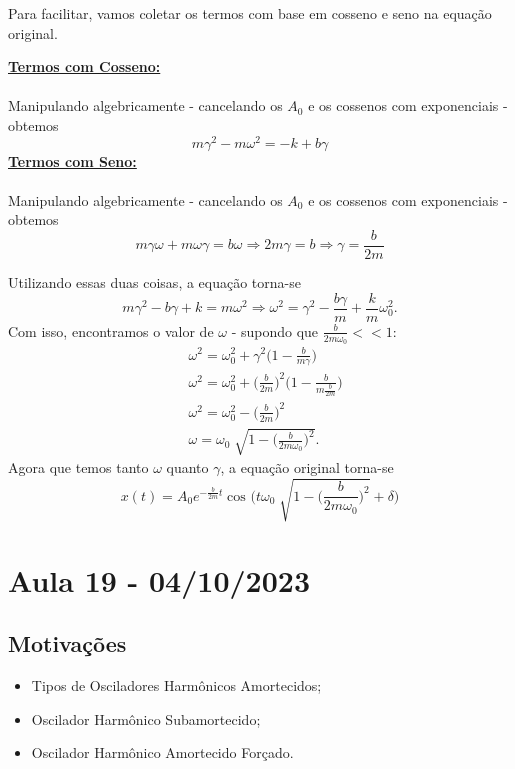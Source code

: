 \documentclass{article}
\begin{document}
Para facilitar, vamos coletar os termos com base em cosseno e seno na equação original.

\textbf{\underline{Termos com Cosseno:}}
\paragraph{}  Manipulando algebricamente - cancelando os \(A_{0}\) e os cossenos com exponenciais - obtemos 
\[
  m\gamma ^{2} - m\omega^{2} = -k + b\gamma 
\]
\newpage
\textbf{\underline{Termos com Seno:}}
\paragraph{}  Manipulando algebricamente - cancelando os \(A_{0}\) e os cossenos com exponenciais - obtemos 
\[
  m\gamma \omega  + m\omega \gamma  = b\omega \Rightarrow 2m\gamma  = b \Rightarrow \gamma = \frac{b}{2m}
\]

Utilizando essas duas coisas, a equação torna-se 
\[
  m\gamma ^{2} - b\gamma + k = m\omega ^{2} \Rightarrow \omega ^{2} = \gamma ^{2}-\frac{b\gamma }{m}+\frac{k}{m}\omega_{0}^{2}.
\]
Com isso, encontramos o valor de \(\omega\) - supondo que \(\frac{b}{2m\omega_{0}} <<1\):
\begin{align*}
  &\omega ^{2} = \omega_{0}^{2} + \gamma ^{2}\biggl(1 - \frac{b}{m\gamma }\biggr)\\
  &\omega ^{2} = \omega_{0}^{2} + \biggl(\frac{b}{2m}\biggr)^{2}\biggl(1-\frac{b}{m \frac{b}{2m}}\biggr)\\
  &\omega ^{2} = \omega_{0}^{2} - \biggl(\frac{b}{2m}\biggr)^{2}\\
  &\omega  = \omega_{0}\sqrt[]{1-\biggl(\frac{b}{2m\omega_{0}}\biggr)^{2}}.
\end{align*}
Agora que temos tanto \(\omega \) quanto \(\gamma \), a equação original torna-se 
\[
  \boxed{x(t) = A_{0}e^{-\frac{b}{2m}t}\cos^{}{\biggl(t\omega_{0}\sqrt[]{1-\biggl(\frac{b}{2m\omega_{0}}\biggr)^{2}}+\delta \biggr)}}
\]
\newpage

\section{Aula 19 - 04/10/2023}
\subsection{Motivações}
\begin{itemize}
  \item Tipos de Osciladores Harmônicos Amortecidos;
  \item Oscilador Harmônico Subamortecido;
  \item Oscilador Harmônico Amortecido Forçado.
\end{itemize}
\end{document}
